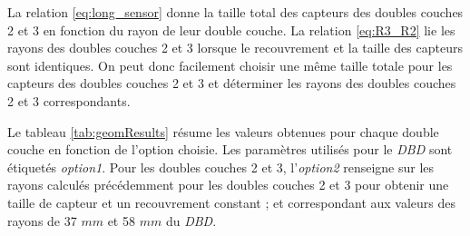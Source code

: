 %   
%   
  
  La relation \ref{eq:long_sensor} donne la taille total des capteurs des doubles couches 2 et 3 en fonction du rayon de leur double couche. La relation \ref{eq:R3_R2} lie les rayons des doubles couches 2 et 3 lorsque le recouvrement et la taille des capteurs sont identiques. On peut donc facilement choisir une m\^eme taille totale pour les capteurs des doubles couches 2 et 3 et d\'eterminer les rayons des doubles couches 2 et 3 correspondants.
  
  \medskip
  
  Le tableau \ref{tab:geomResults} r\'esume les valeurs obtenues pour chaque double couche en fonction de l'option choisie. Les param\`etres utilis\'es pour le \textit{DBD} sont \'etiquetés \textit{option1}. Pour les doubles couches 2 et 3, l'\textit{option2} renseigne sur les rayons calcul\'es pr\'ec\'edemment pour les doubles couches 2 et 3 pour obtenir une taille de capteur et un recouvrement constant ; et correspondant aux valeurs des rayons de 37 $mm$ et 58 $mm$ du \textit{DBD}.
  
